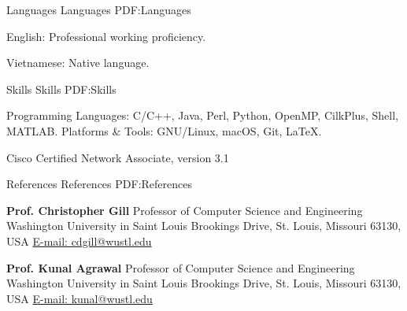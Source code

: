\documentclass[letterpaper,MMMyyyy,nonstopmode]{simpleresumecv}
\begin{document}
\begin{Body}
\begin{comment}
\end{comment}




\Section
{Languages}
{Languages}
{PDF:Languages}

\BulletItem
English: Professional working proficiency.

\Gap
\BulletItem
Vietnamese: Native language.



\Section
{Skills}
{Skills}
{PDF:Skills}

\Entry
\BulletItem
Programming Languages: C/C++, Java, Perl, Python, OpenMP, CilkPlus, Shell, MATLAB.
\BulletItem
Platforms \& Tools: GNU/Linux, macOS, Git, {\LaTeX}.




\Entry
\BulletItem Cisco Certified Network Associate, version 3.1
\hfill {}






\Section
{References}
{References}
{PDF:References}

\BulletItem
\textbf{Prof. Christopher Gill}
\newline
Professor of Computer Science and Engineering
\newline
Washington University in Saint Louis
 Brookings Drive, St. Louis, Missouri 63130, USA
\newline
\href{mailto:cdgill@wustl.edu}
{E-mail: cdgill@wustl.edu}

\BigGap
\BulletItem
\textbf{Prof. Kunal Agrawal}
\newline
Professor of Computer Science and Engineering
\newline
Washington University in Saint Louis
 Brookings Drive, St. Louis, Missouri 63130, USA
\newline
\href{mailto:kunal@wustl.edu}
{E-mail: kunal@wustl.edu}


\end{Body}
\end{document}
